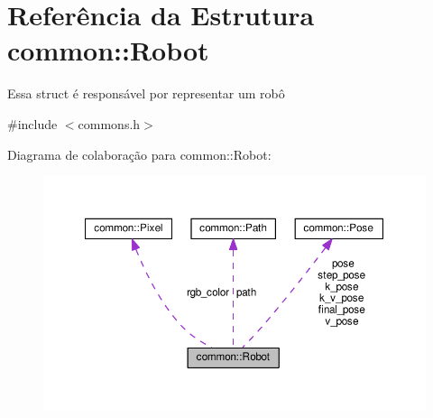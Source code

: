 \hypertarget{structcommon_1_1Robot}{}\section{Referência da Estrutura common\+:\+:Robot}
\label{structcommon_1_1Robot}


Essa struct é responsável por representar um robô  




{\ttfamily \#include $<$commons.\+h$>$}



Diagrama de colaboração para common\+:\+:Robot\+:\nopagebreak
\begin{figure}[H]
\begin{center}
\leavevmode
\includegraphics[width=350pt]{structcommon_1_1Robot__coll__graph}
\end{center}
\end{figure}
